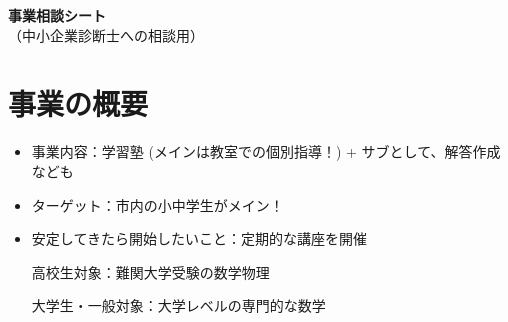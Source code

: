 ﻿\documentclass[12pt]{article}
\begin{document}
\begin{center}
    {\LARGE \bf 事業相談シート} \\
    \vspace{1mm}
    （中小企業診断士への相談用）
\end{center}

\vspace{1mm}

\section{事業の概要}
\begin{itemize}[leftmargin=1.5em, itemsep=3mm, parsep=4pt]
  \item 事業内容：学習塾 (メインは教室での個別指導！) + サブとして、解答作成なども
  \item ターゲット：市内の小中学生がメイン！
  \item 安定してきたら開始したいこと：定期的な講座を開催
  
  高校生対象：難関大学受験の数学物理
  
  大学生・一般対象：大学レベルの専門的な数学
\end{itemize}
\end{document}
